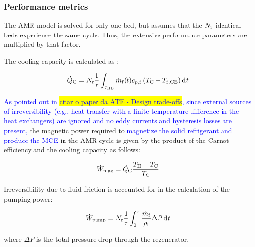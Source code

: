 \documentclass[referee]{svjour3}
\newcommand{\mrate}{\rate{m}}
\begin{document}

\subsubsection{Performance metrics}
\label{sec:performance-metrics}

The AMR model is solved for only one bed, but  assumes that the $N_{\mathrm{r}}$ identical beds experience the same cycle. Thus, the extensive performance parameters are multiplied by that factor.


The cooling capacity is calculated as \cite{bib:trevizoli16_perfor_model}:

\begin{equation}
\label{eq:99}
\qc = N\ped{r}\frac{1}{\tau} \int_{\tau\ped{HB}} \mrate\ped{f}(t) c_{p,\mathrm{f}} \left( T\ped{C} -T\ped{f,CE} \right) \diffd{t}
\end{equation}


\nomenclature[am]{$\mrate\ped{f}$}{mass flow rate [\si{\kg\per\second}]}


\textcolor{blue}{As pointed out in \colorbox{yellow}{citar o paper da ATE - Design trade-offs}, since external sources of irreversibility (e.g., heat transfer with a finite temperature difference in the heat exchangers) are ignored and no eddy currents and hysteresis losses are present,} the magnetic power required to \textcolor{blue}{magnetize the solid refrigerant and produce the MCE} in the AMR cycle is given by the product of the Carnot efficiency and the cooling capacity as follows:

\begin{equation}
\label{eq:100}
\dot{W}_{\mathrm{mag}} = \dot{Q}_{\mathrm{C}} \frac{T_{\mathrm{H}} - T_{\mathrm{C}}}{T_{\mathrm{C}}}
\end{equation}

Irreversibility due to fluid friction is accounted for in the calculation of the pumping power:

\begin{equation}
\label{eq:103}
\wpump = N\ped{r}\frac{1}{\tau}\int_0^{\tau}\frac{\rate{m}\ped{f}}{\rho\ped{f}} \Delta P \diffd{t}
\end{equation}

\noindent where $\Delta P$ is the total pressure drop through the regenerator.
\end{document}
